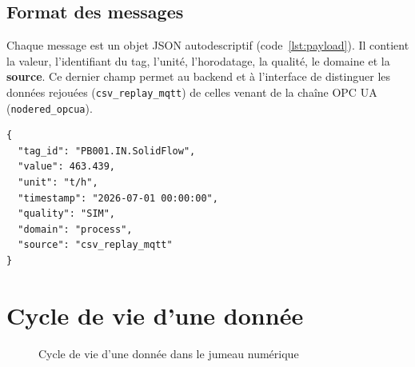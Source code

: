 \subsection{Format des messages}
Chaque message est un objet JSON autodescriptif (code~\ref{lst:payload}). Il contient la valeur, l'identifiant du tag, l'unité, l'horodatage, la qualité, le domaine et la \textbf{source}. Ce dernier champ permet au backend et à l'interface de distinguer les données rejouées (\texttt{csv\_replay\_mqtt}) de celles venant de la chaîne OPC UA (\texttt{nodered\_opcua}).

\begin{lstlisting}[caption={Exemple de message publié par la relecture},label={lst:payload}]
{
  "tag_id": "PB001.IN.SolidFlow",
  "value": 463.439,
  "unit": "t/h",
  "timestamp": "2026-07-01 00:00:00",
  "quality": "SIM",
  "domain": "process",
  "source": "csv_replay_mqtt"
}
\end{lstlisting}

\section{Cycle de vie d'une donnée}

\begin{figure}[H]
\centering
{}
\caption{Cycle de vie d'une donnée dans le jumeau numérique}
\label{fig:cycle}
\end{figure}

